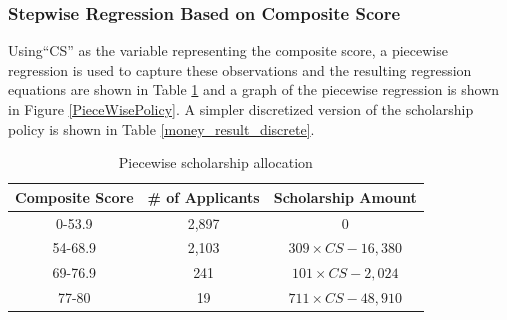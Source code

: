\documentclass[12pt,english]{report}
\begin{document}

%


\subsubsection{Stepwise Regression Based on Composite Score}
Using``CS'' as the variable representing the composite score, a piecewise regression is used to capture these observations and the resulting regression equations are shown in Table \ref{money_result} and a graph of the piecewise regression is shown in  Figure \ref{PieceWisePolicy}. A simpler discretized version of the scholarship policy is shown in Table \ref{money_result_discrete}. 

\begin{table}[H]
\centering
\begin{tabular}{|c|c|c|}
\hline
Composite Score & \# of Applicants & Scholarship Amount \\ \hline
0-53.9         & 2,897  &0              \\ \hline
54-68.9        & 2,103  &$309\times CS -16,380 $            \\ \hline
69-76.9        &  241 &  $101\times CS - 2,024$           \\ \hline
77-80       & 19 &   $711 \times CS -48,910$          \\ \hline
\end{tabular}
\caption{Piecewise scholarship allocation}
\label{money_result}
\end{table}
\end{document}
